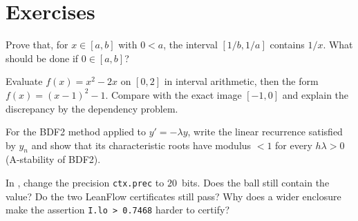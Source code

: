 \section{Exercises}\label{appD:sec:exos}

\begin{exercise}
Prove that, for $x\in[a,b]$ with $0<a$, the interval $[1/b,1/a]$ contains $1/x$. What should be done if $0\in[a,b]$?
\end{exercise}

\begin{exercise}
Evaluate $f(x)=x^2-2x$ on $[0,2]$ in interval arithmetic, then the form $f(x)=(x-1)^2-1$. Compare with the exact image
$[-1,0]$ and explain the discrepancy by the dependency problem.
\end{exercise}

\begin{exercise}
For the BDF2 method applied to $y'=-\lambda y$, write the linear recurrence satisfied by $y_n$ and show that its
characteristic roots have modulus $<1$ for every $h\lambda>0$ (A-stability of BDF2).
\end{exercise}

\begin{exercise}
In , change the precision \texttt{ctx.prec} to $20$~bits. Does the ball still contain the
value? Do the two LeanFlow certificates still pass? Why does a wider enclosure make the assertion
\texttt{I.lo > 0.7468} harder to certify?
\end{exercise}
